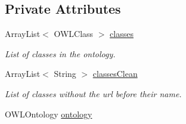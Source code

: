 \subsection*{Private Attributes}
\begin{DoxyCompactItemize}
\item 
\hypertarget{class_ontology_1_1_object_property_a0fb4e9a0cfa7cb785880cd19764cb80c}{
ArrayList$<$ OWLClass $>$ \hyperlink{class_ontology_1_1_object_property_a0fb4e9a0cfa7cb785880cd19764cb80c}{classes}}
\label{class_ontology_1_1_object_property_a0fb4e9a0cfa7cb785880cd19764cb80c}

\begin{DoxyCompactList}\small\item\em List of classes in the ontology. \end{DoxyCompactList}\item 
\hypertarget{class_ontology_1_1_object_property_aa8e9d767788209520016911f53bb0f58}{
ArrayList$<$ String $>$ \hyperlink{class_ontology_1_1_object_property_aa8e9d767788209520016911f53bb0f58}{classesClean}}
\label{class_ontology_1_1_object_property_aa8e9d767788209520016911f53bb0f58}

\begin{DoxyCompactList}\small\item\em List of classes without the url before their name. \end{DoxyCompactList}\item 
\hypertarget{class_ontology_1_1_object_property_a29d4ef0f8ba3a809b35cc36b6863f122}{
OWLOntology \hyperlink{class_ontology_1_1_object_property_a29d4ef0f8ba3a809b35cc36b6863f122}{ontology}}
\label{class_ontology_1_1_object_property_a29d4ef0f8ba3a809b35cc36b6863f122}


\end{DoxyCompactItemize}
